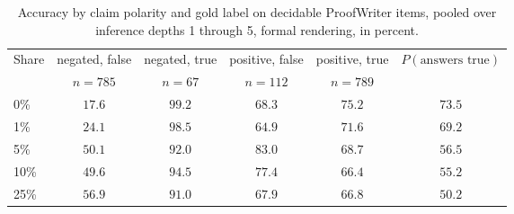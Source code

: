 \begin{table}[t]
\caption{Accuracy by claim polarity and gold label on decidable ProofWriter items, pooled over inference depths 1 through 5, formal rendering, in percent.}
\label{tab:mechanism}
\begin{center}
\begin{tabular}{lccccc}
\toprule
Share & negated, false & negated, true & positive, false & positive, true & $P(\text{answers true})$ \\
      & $n=785$ & $n=67$ & $n=112$ & $n=789$ & \\
\midrule
0\%   & $17.6$ & $99.2$ & $68.3$ & $75.2$ & $73.5$ \\
1\%   & $24.1$ & $98.5$ & $64.9$ & $71.6$ & $69.2$ \\
5\%   & $50.1$ & $92.0$ & $83.0$ & $68.7$ & $56.5$ \\
10\%  & $49.6$ & $94.5$ & $77.4$ & $66.4$ & $55.2$ \\
25\%  & $56.9$ & $91.0$ & $67.9$ & $66.8$ & $50.2$ \\
\bottomrule
\end{tabular}
\end{center}
\end{table}